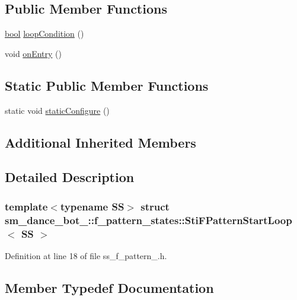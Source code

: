 \subsection*{Public Member Functions}
\begin{DoxyCompactItemize}
\item 
\hyperlink{classbool}{bool} \hyperlink{classsm__dance__bot__2_1_1f__pattern__states_1_1StiFPatternStartLoop_a196f787a1686a408e9e36b8c99cf4db9}{loop\+Condition} ()
\item 
void \hyperlink{classsm__dance__bot__2_1_1f__pattern__states_1_1StiFPatternStartLoop_a2b8e11d56d2a4efb0d8d875e2df832cd}{on\+Entry} ()
\end{DoxyCompactItemize}
\subsection*{Static Public Member Functions}
\begin{DoxyCompactItemize}
\item 
static void \hyperlink{classsm__dance__bot__2_1_1f__pattern__states_1_1StiFPatternStartLoop_ab6331bda3a9b7c5e33bc903ea93a91ba}{static\+Configure} ()
\end{DoxyCompactItemize}
\subsection*{Additional Inherited Members}


\subsection{Detailed Description}
\subsubsection*{template$<$typename SS$>$\newline
struct sm\+\_\+dance\+\_\+bot\+\_\+::f\+\_\+pattern\+\_\+states\+::\+Sti\+F\+Pattern\+Start\+Loop$<$ S\+S $>$}



Definition at line 18 of file ss\+\_\+f\+\_\+pattern\+\_.\+h.



\subsection{Member Typedef Documentation}
\mbox{\label{classsm__dance__bot__2_1_1f__pattern__states_1_1StiFPatternStartLoop_a93f6fd1001554fdafc79b058c2162c5f}} 
